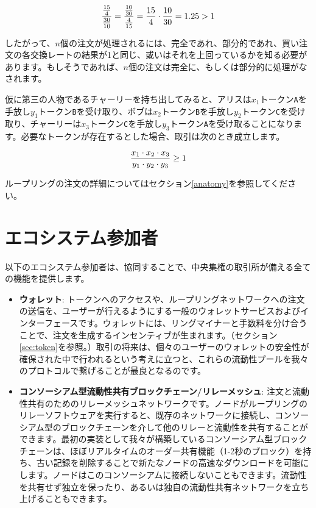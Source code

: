 \documentclass{article}
\begin{document}
\begin{multicols}{2}
\begin{equation}
{{15\over 4} \over {30\over 10}} = {{10\over 30} \over {4\over 15}}={15 \over 4} \cdot {10 \over 30} = 1.25 > 1
\end{equation}

したがって、$n$個の注文が処理されるには、完全であれ、部分的であれ、買い注文の各交換レートの結果が1と同じ、或いはそれを上回っているかを知る必要があります。もしそうであれば、$n$個の注文は完全に、もしくは部分的に処理がなされます。\cite{supersymmetry}

仮に第三の人物であるチャーリーを持ち出してみると、アリスは$x_1$トークン\verb|A|を手放し$y_1$トークン\verb|B|を受け取り、ボブは$x_2$トークン\verb|B|を手放し$y_2$トークン\verb|C|を受け取り、チャーリーは$x_3$トークン\verb|C|を手放し$y_3$トークン\verb|A|を受け取ることになります。必要なトークンが存在するとした場合、取引は次のとき成立します。

\begin{equation}
{{x_1 \cdot x_2 \cdot x_3 \over y_1 \cdot y_2 \cdot y_3} \geq 1}
\end{equation}


ループリングの注文の詳細についてはセクション\ref{anatomy}を参照してください。



\section{エコシステム参加者\label{sec:ecosystem}}
以下のエコシステム参加者は、協同することで、中央集権の取引所が備える全ての機能を提供します。

\begin{itemize}

\item \textbf{ウォレット}: トークンへのアクセスや、ループリングネットワークへの注文の送信を、ユーザーが行えるようにする一般のウォレットサービスおよびインターフェースです。ウォレットには、リングマイナーと手数料を分け合うことで、注文を生成するインセンティブが生まれます。（セクション\ref{sec:token}を参照。）取引の将来は、個々のユーザーのウォレットの安全性が確保された中で行われるという考えに立つと、これらの流動性プールを我々のプロトコルで繋げることが最良となるのです。

\item \textbf{コンソーシアム型流動性共有ブロックチェーン/リレーメッシュ}: 注文と流動性共有のためのリレーメッシュネットワークです。ノードがループリングのリレーソフトウェアを実行すると、既存のネットワークに接続し、コンソーシアム型のブロックチェーンを介して他のリレーと流動性を共有することができます。最初の実装として我々が構築しているコンソーシアム型ブロックチェーンは、ほぼリアルタイムのオーダー共有機能（1-2秒のブロック）を持ち、古い記録を削除することで新たなノードの高速なダウンロードを可能にします。ノードはこのコンソーシアムに接続しないこともできます。流動性を共有せず独立を保ったり、あるいは独自の流動性共有ネットワークを立ち上げることもできます。


\end{itemize}
\end{multicols}
\end{document}

